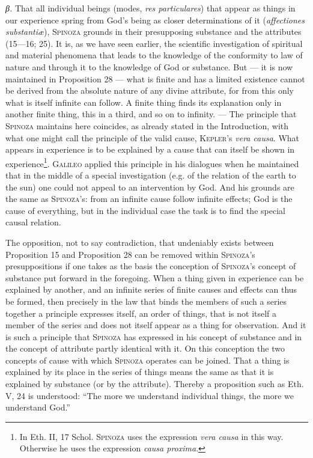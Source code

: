 \documentclass[12pt]{article}
\begin{document}
\textit{β.} That all individual beings (modes, \textit{res particulares}) that appear as
things in our experience spring from God's being as closer determinations of it
(\textit{affectiones substantiæ}), \textsc{Spinoza} grounds in their presupposing
substance and the attributes (15---16; 25). It is, as we have seen earlier, the
scientific investigation of spiritual and material phenomena that leads to the knowledge
of the conformity to law of nature and through it to the knowledge of God or substance.
But --- it is now maintained in Proposition 28 --- what is finite and has a limited
existence cannot be derived from the absolute nature of any divine attribute, for from
this only what is itself infinite can follow. A finite thing finds its explanation only
in another finite thing, this in a third, and so on to infinity. --- The principle that
\textsc{Spinoza} maintains here coincides, as already stated in the Introduction, with
what one might call the principle of the valid cause, \textsc{Kepler}'s \textit{vera
causa}. What appears in experience is to be explained by a cause that can itself be
shown in experience\footnote{In Eth. II, 17 Schol. \textsc{Spinoza} uses the expression
\textit{vera causa} in this way. Otherwise he uses the expression \textit{causa
proxima}.}. \textsc{Galileo} applied this principle in his dialogues when he maintained
that in the middle of a special investigation (e.g. of the relation of the earth to the
sun) one could not appeal to an intervention by God. And his grounds are the same as
\textsc{Spinoza}'s: from an infinite cause follow infinite effects; God is the cause of
everything, but in the individual case the task is to find the special causal relation.

The opposition, not to say contradiction, that undeniably exists between Proposition 15
and Proposition 28 can be removed within \textsc{Spinoza}'s presuppositions if one takes
as the basis the conception of \textsc{Spinoza}'s concept of substance put forward in the
foregoing. When a thing given in experience can be explained by another, and an infinite
series of finite causes and effects can thus be formed, then precisely in the law that
binds the members of such a series together a principle expresses itself, an order of
things, that is not itself a member of the series and does not itself appear as a thing
for observation. And it is such a principle that \textsc{Spinoza} has expressed in his
concept of substance and in the concept of attribute partly identical with it. On this
conception the two concepts of cause with which \textsc{Spinoza} operates can be
joined. That a thing is explained by its place in the series of things means the same as
that it is explained by substance (or by the attribute). Thereby a proposition such as
Eth. V, 24 is understood: ``The more we understand individual things, the more we
understand God.''
\end{document}
